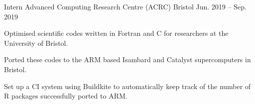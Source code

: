 \begin{cventries}
  \cventry
    {Intern} %
    {Advanced Computing Research Centre (ACRC)} %
    {Bristol} %
    {Jun. 2019 -- Sep. 2019} %
    {
      \begin{cvitems} %
        \item {Optimised scientific codes written in Fortran and C for researchers at the University of Bristol.}
        \item {Ported these codes to the ARM based Isambard and Catalyst supercomputers in Bristol.}
        \item {Set up a CI system using Buildkite to automatically keep track of the number of R packages successfully ported to ARM.}
      \end{cvitems}
    }

\end{cventries}
